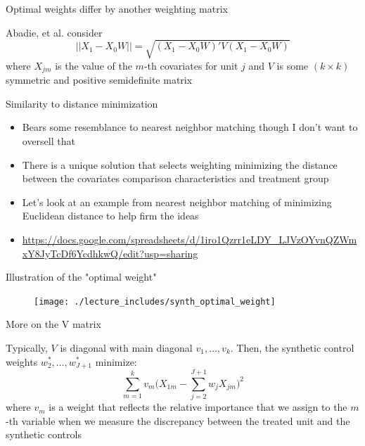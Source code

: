 \documentclass{beamer}
\begin{document}
\begin{frame}{Optimal weights differ by another weighting matrix}
	
Abadie, et al. consider $$||X_1 - X_0W||=\sqrt{(X_1-X_0W)'V(X_1-X_0W)}$$where $X_{jm}$ is the value of the $m$-th covariates for unit $j$ and $V$ is some $(k\times k)$ symmetric and positive semidefinite matrix

\end{frame}

\begin{frame}{Similarity to distance minimization}

\begin{itemize}
\item Bears some resemblance to nearest neighbor matching though I don't want to oversell that
\item There is a unique solution that selects weighting minimizing the distance between the covariates comparison characteristics and treatment group
\item Let's look at an example from nearest neighbor matching of minimizing Euclidean distance to help firm the ideas
\item \url{https://docs.google.com/spreadsheets/d/1iro1Qzrr1eLDY_LJVzOYvnQZWmxY8JyTcDf6YcdhkwQ/edit?usp=sharing}
\end{itemize}

\end{frame}

\begin{frame}{Illustration of the "optimal weight"}

\begin{figure}
\texttt{[image: ./lecture\_includes/synth\_optimal\_weight]}
\end{figure}

\end{frame}



\begin{frame}{More on the V matrix}

Typically, $V$ is diagonal with main diagonal $v_1, \dots, v_k$.  Then, the synthetic control weights $w_2^*, \dots, w_{J+1}^*$ minimize: $$\sum_{m=1}^k v_m \bigg(X_{1m} - \sum_{j=2}^{J+1}w_jX_{jm}\bigg)^2$$ where $v_m$ is a weight that reflects the relative importance that we assign to the $m$-th variable when we measure the discrepancy between the treated unit and the synthetic controls

\end{frame}
\end{document}
